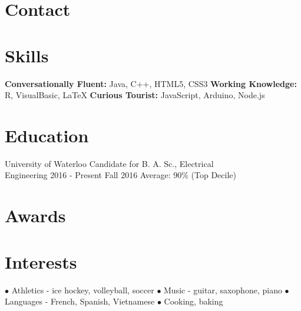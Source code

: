 \documentclass[]{aanguyen_cv}
\begin{document}
	\begin{sidebar}%
		\vspace{35pt}%
		\section{Contact}
			\vspace{0.65cm}%
		\section{Skills}
			\textbf{Conversationally Fluent: }Java, C++, HTML5, CSS3
			\textbf{Working Knowledge: }R, VisualBasic, \LaTeX
			\textbf{Curious Tourist: }JavaScript, Arduino, Node.js
			\vspace{0.65cm}%
		\section{Education}
			\eduentry%
				{University of Waterloo}%
				{Candidate for B. A. Sc., Electrical\\Engineering}%
				{2016 - Present}%
				{Fall 2016 Average: 90\% (Top Decile)}
			\vspace{0.65cm}%
		\section{Awards}
			\vspace{0.65cm}%
		\section{Interests}
		$\bullet$ Athletics - ice hockey, volleyball, soccer
		$\bullet$ Music - guitar, saxophone, piano
		$\bullet$ Languages - French, Spanish, Vietnamese
		$\bullet$ Cooking, baking
	\end{sidebar}%
\end{document}
